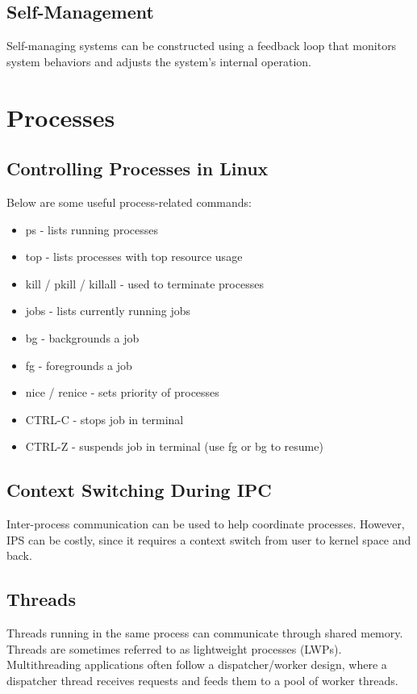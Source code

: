 \documentclass[12pt,titlepage]{article}
\begin{document}
    \subsection{Self-Management}
      Self-managing systems can be constructed using a feedback loop that monitors system behaviors and adjusts the system's internal operation.

  \newpage

  \section{Processes}
    \subsection{Controlling Processes in Linux}
      Below are some useful process-related commands:
      \begin{itemize}
        \item ps - lists running processes
        \item top - lists processes with top resource usage
        \item kill / pkill / killall - used to terminate processes
        \item jobs - lists currently running jobs
        \item bg - backgrounds a job
        \item fg - foregrounds a job
        \item nice / renice - sets priority of processes
        \item CTRL-C - stops job in terminal
        \item CTRL-Z - suspends job in terminal (use fg or bg to resume)
      \end{itemize}

    \subsection{Context Switching During IPC}
      Inter-process communication can be used to help coordinate processes. However, IPS can be costly, since it requires a context switch from user to
      kernel space and back.

    \subsection{Threads}
      Threads running in the same process can communicate through shared memory. Threads are sometimes referred to as lightweight processes (LWPs).
      Multithreading applications often follow a dispatcher/worker design, where a dispatcher thread receives requests and feeds them to a pool
      of worker threads.
\end{document}

